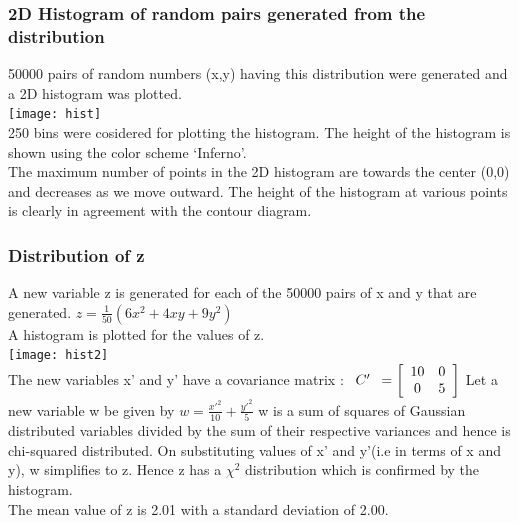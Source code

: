 \documentclass{extarticle}
\begin{document}
		\subsubsection{\color{RoyalBlue} 2D Histogram of random pairs generated from the distribution}
			50000 pairs of random numbers (x,y) having this distribution were generated and a 2D histogram was plotted. \\
			\texttt{[image: hist]} \\
			250 bins were cosidered for plotting the histogram. The height of the histogram is shown using the color scheme 			`Inferno'. \\
			The maximum number of points in the 2D histogram are towards the center (0,0) and decreases as we move outward.
			The height of the histogram at various points is clearly in agreement with the contour diagram.

		\subsubsection{\color{RoyalBlue} Distribution of z}
			A new variable z is generated for each of the 50000 pairs of x and y that are generated.
			$ z = \frac{1}{50} (6x^2 + 4xy + 9y^2) $ \\
			A histogram is plotted for the values of z. \\
			\texttt{[image: hist2]} \\
			The new variables x' and y' have a covariance matrix :
			$ \begin{array}{c} C' \end{array} = \left [\begin{array}{c c} 10 & 0 \\0 & 5\end{array} \right ] $
			Let a new variable w be given by
			$ w = \frac{{x'}^2}{10} + \frac{{y'}^2}{5} $
			w is a sum of squares of Gaussian distributed variables divided by the sum of their respective variances and hence 				is chi-squared distributed. On substituting values of x' and y'(i.e in terms of x and y), w simplifies to z.
			Hence z has a $ \chi^2 $ distribution which is confirmed by the histogram. \\
			The mean value of z is 2.01 with a standard deviation of 2.00.


		\newpage
\end{document}
